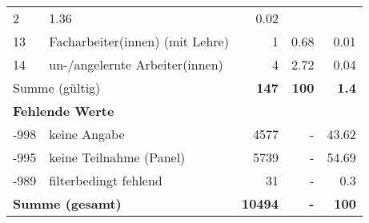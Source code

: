 \begin{longtable}{lXrrr}
       \num{2} &
       \num[round-mode=places,round-precision=2]{1.36} &
         \num[round-mode=places,round-precision=2]{0.02} \\

     13 &
     \multicolumn{1}{X}{ Facharbeiter(innen) (mit Lehre)   } &


       \num{1} &
       \num[round-mode=places,round-precision=2]{0.68} &
         \num[round-mode=places,round-precision=2]{0.01} \\

     14 &
     \multicolumn{1}{X}{ un-/angelernte Arbeiter(innen)   } &


       \num{4} &
       \num[round-mode=places,round-precision=2]{2.72} &
         \num[round-mode=places,round-precision=2]{0.04} \\
     \midrule
     \multicolumn{2}{l}{Summe (gültig)} &
       \textbf{\num{147}} &
     \textbf{\num{100}} &
       \textbf{\num[round-mode=places,round-precision=2]{1.4}} \\
     \multicolumn{5}{l}{\textbf{Fehlende Werte}}\\
       -998 &
       keine Angabe &
         \num{4577} &
        - &
         \num[round-mode=places,round-precision=2]{43.62} \\
       -995 &
       keine Teilnahme (Panel) &
         \num{5739} &
        - &
         \num[round-mode=places,round-precision=2]{54.69} \\
       -989 &
       filterbedingt fehlend &
         \num{31} &
        - &
         \num[round-mode=places,round-precision=2]{0.3} \\
     \midrule
     \multicolumn{2}{l}{\textbf{Summe (gesamt)}} &
          \textbf{\num{10494}} &
        \textbf{-} &
        \textbf{\num{100}} \\
     \bottomrule
     \end{longtable}
     
